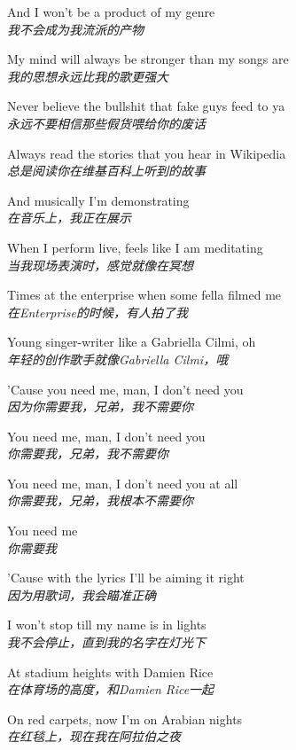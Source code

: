 \begin{spacing}{1.5}
\begin{flushleft}
And I won't be a product of my genre\\
\textit{我不会成为我流派的产物}\lyricspace

My mind will always be stronger than my songs are\\
\textit{我的思想永远比我的歌更强大}\lyricspace

Never believe the bullshit that fake guys feed to ya\\
\textit{永远不要相信那些假货喂给你的废话}\lyricspace

Always read the stories that you hear in Wikipedia\\
\textit{总是阅读你在维基百科上听到的故事}\lyricspace

And musically I'm demonstrating\\
\textit{在音乐上，我正在展示}\lyricspace

When I perform live, feels like I am meditating\\
\textit{当我现场表演时，感觉就像在冥想}\lyricspace

Times at the enterprise when some fella filmed me\\
\textit{在Enterprise的时候，有人拍了我}\lyricspace

Young singer-writer like a Gabriella Cilmi, oh\\
\textit{年轻的创作歌手就像Gabriella Cilmi，哦}\lyricspace

'Cause you need me, man, I don't need you\\
\textit{因为你需要我，兄弟，我不需要你}\lyricspace

You need me, man, I don't need you\\
\textit{你需要我，兄弟，我不需要你}\lyricspace

You need me, man, I don't need you at all\\
\textit{你需要我，兄弟，我根本不需要你}\lyricspace

You need me\\
\textit{你需要我}\lyricspace

'Cause with the lyrics I'll be aiming it right\\
\textit{因为用歌词，我会瞄准正确}\lyricspace

I won't stop till my name is in lights\\
\textit{我不会停止，直到我的名字在灯光下}\lyricspace

At stadium heights with Damien Rice\\
\textit{在体育场的高度，和Damien Rice一起}\lyricspace

On red carpets, now I'm on Arabian nights\\
\textit{在红毯上，现在我在阿拉伯之夜}\lyricspace


\end{flushleft}
\end{spacing}
